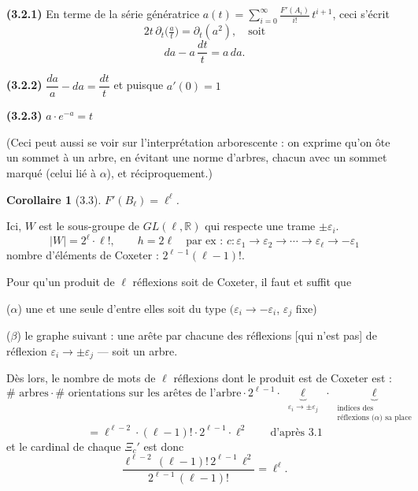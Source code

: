 \documentclass[11pt,a4paper]{article}
\theoremstyle{plain}
\newtheorem{corollary}[theorem]{Corollaire}
\theoremstyle{definition}
\begin{document}
\smallskip

\noindent
\textbf{(3.2.1)} En terme de la s\'erie g\'en\'eratrice $\displaystyle a(t) = \sum_{i=0}^{\infty} \frac{F'(A_i)}{i!}\, t^{i+1}$, ceci s'\'ecrit
\[
2t \, \partial_t\bigl(\tfrac{a}{t}\bigr) = \partial_t(a^2), \quad \text{soit}
\]
\[
da - a\,\frac{dt}{t} = a\, da.
\]

\smallskip

\noindent
\textbf{(3.2.2)} $\dfrac{da}{a} - da = \dfrac{dt}{t}$ \quad et puisque $a'(0) = 1$

\smallskip

\noindent
\textbf{(3.2.3)} $a \cdot e^{-a} = t$

\smallskip

\noindent
(Ceci peut aussi se voir sur l'interpr\'etation arborescente : on exprime qu'on \^ote un sommet \`a un arbre, en \'evitant une norme d'arbres, chacun avec un sommet marqu\'e (celui li\'e \`a $\alpha$), et r\'eciproquement.)

\newpage

\begin{corollary}[3.3]
$F'(B_\ell) = \ell^\ell$.
\end{corollary}

Ici, $W$ est le sous-groupe de $GL(\ell, \mathbb{R})$ qui respecte une trame $\pm\varepsilon_i$.
\[
|W| = 2^\ell \cdot \ell!, \qquad h = 2\ell \quad \text{par ex : } c : \varepsilon_1 \to \varepsilon_2 \to \cdots \to \varepsilon_\ell \to -\varepsilon_1
\]
nombre d'\'el\'ements de Coxeter : $2^{\ell-1} (\ell-1)!$.

Pour qu'un produit de $\ell$ r\'eflexions soit de Coxeter, il faut et suffit que

\smallskip

\noindent
($\alpha$) une et une seule d'entre elles soit du type $(\varepsilon_i \to -\varepsilon_i$, $\varepsilon_j$ fixe)

\smallskip

\noindent
($\beta$) le graphe suivant : une ar\^ete par chacune des r\'eflexions [qui n'est pas] de r\'eflexion $\varepsilon_i \to \pm\varepsilon_j$ --- soit un arbre.

\smallskip

D\`es lors, le nombre de mots de $\ell$ r\'eflexions dont le produit est de Coxeter est :
\[
\# \text{ arbres} \cdot \# \text{ orientations sur les ar\^etes de l'arbre} \cdot 2^{\ell-1} \cdot \underbrace{\ell}_{\substack{\varepsilon_i \to \pm\varepsilon_j}} \cdot \underbrace{\ell}_{\substack{\text{indices des} \\ \text{r\'eflexions ($\alpha$) sa place}}}
\]
\[
= \ell^{\ell-2} \cdot (\ell-1)! \cdot 2^{\ell-1} \cdot \ell^2 \qquad \text{d'apr\`es 3.1}
\]
et le cardinal de chaque $\Xi_c'$ est donc
\[
\frac{\ell^{\ell-2}\, (\ell-1)! \, 2^{\ell-1}\, \ell^2}{2^{\ell-1}\, (\ell-1)!} = \ell^\ell.
\]
\end{document}

